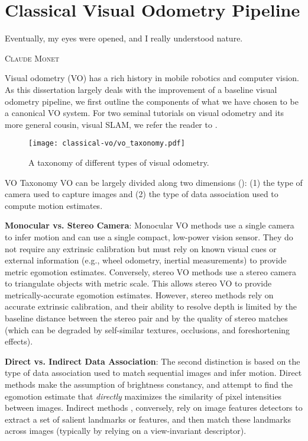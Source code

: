 \chapter{Classical Visual Odometry Pipeline}
\label{ch:vo}
\epigraph{Eventually, my eyes were opened, and I really understood nature.}{\textsc{Claude Monet}}

Visual odometry (VO) has a rich history in mobile robotics and computer vision. As this dissertation largely deals with the improvement of a baseline visual odometry pipeline, we first outline the components of what we have chosen to be a canonical VO system. For two seminal tutorials on visual odometry and its more general cousin, visual SLAM, we refer the reader to \cite{Scaramuzza2011-qr,Cadena2016-ds}.

\begin{figure}[h!]
\begin{center}
		\texttt{[image: classical-vo/vo\_taxonomy.pdf]}
		\caption{A taxonomy of different types of visual odometry.}
  	\label{fig:vo_taxonomy}
\end{center}
\end{figure}

\newpage
\begin{remark}{VO Taxonomy}
VO can be largely divided along two dimensions (): (1) the type of camera used to capture images and (2) the type of data association used to compute motion estimates. 

\textbf{Monocular vs. Stereo Camera}:
 Monocular VO methods \citep{engel_direct_2018,Tsotsos2015} use a single camera to infer motion and can use a single compact, low-power vision sensor. They do not require any extrinsic calibration but must rely on known visual cues or external information (e.g., wheel odometry, inertial measurements) to provide metric egomotion estimates. Conversely, stereo VO methods \citep{engel_direct_2018, Leutenegger2015-fk, Cvisic2015-mt} use a stereo camera to triangulate objects with metric scale. This allows stereo VO to provide metrically-accurate egomotion estimates. However, stereo methods rely on accurate extrinsic calibration, and their ability to resolve depth is limited by the baseline distance between the stereo pair and by the quality of stereo matches (which can be degraded by self-similar textures, occlusions, and foreshortening effects). 

\textbf{Direct vs. Indirect Data Association}:
The second distinction is based on the type of data association used to match sequential images and infer motion. Direct methods \citep{engel_direct_2018,wang_stereo_2017} make the assumption of brightness constancy, and attempt to find the egomotion estimate that \textit{directly} maximizes the similarity of pixel intensities between images. Indirect methods \citep{Leutenegger2015-fk,Cvisic2015-mt}, conversely, rely on image features detectors to extract a set of salient landmarks or features, and then match these landmarks across images (typically by relying on a view-invariant descriptor).	
\end{remark}



